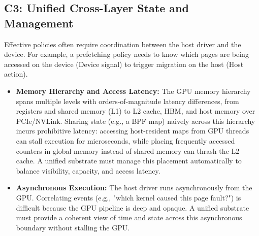 \subsection{C3: Unified Cross-Layer State and Management}
Effective policies often require coordination between the host driver and the device. For example, a prefetching policy needs to know which pages are being accessed on the device (Device signal) to trigger migration on the host (Host action).
\begin{itemize}[leftmargin=*]
    \item \textbf{Memory Hierarchy and Access Latency:} The GPU memory hierarchy spans multiple levels with orders-of-magnitude latency differences, from registers and shared memory (L1) to L2 cache, HBM, and host memory over PCIe/NVLink. Sharing state (e.g., a BPF map) naively across this hierarchy incurs prohibitive latency: accessing host-resident maps from GPU threads can stall execution for microseconds, while placing frequently accessed counters in global memory instead of shared memory can thrash the L2 cache. A unified substrate must manage this placement automatically to balance visibility, capacity, and access latency.
    \item \textbf{Asynchronous Execution:} The host driver runs asynchronously from the GPU. Correlating events (e.g., "which kernel caused this page fault?") is difficult because the GPU pipeline is deep and opaque. A unified substrate must provide a coherent view of time and state across this asynchronous boundary without stalling the GPU.
\end{itemize}

